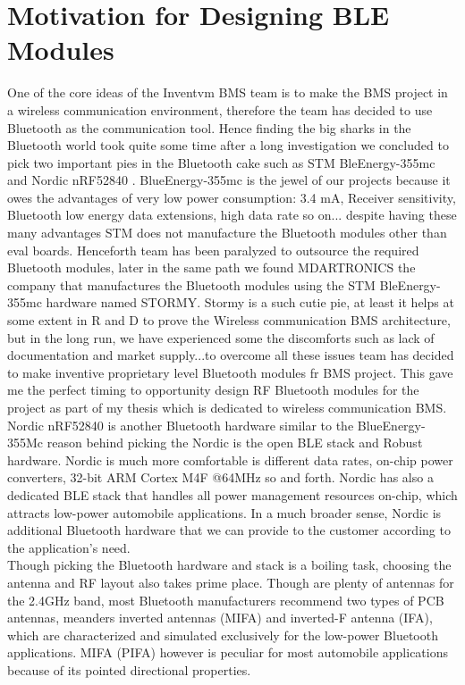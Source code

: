 \section{Motivation for Designing BLE Modules }
One of the core ideas of the Inventvm BMS team is to make the BMS project in a wireless communication environment, therefore the team has decided to use Bluetooth as the communication tool. Hence finding the big sharks in the Bluetooth world took quite some time after a long investigation we concluded to pick two important pies in the Bluetooth cake such as STM BleEnergy-355mc \cite{BLNRG355_STEVAL_GUIDE} and Nordic nRF52840 \cite{NORDIC_nrf52840_USERGUIDE}. BlueEnergy-355mc is the jewel of our projects because it owes the advantages of very low power consumption: 3.4 mA, Receiver sensitivity, Bluetooth low energy data extensions, high data rate so on... despite having these many advantages STM does not manufacture the Bluetooth modules other than eval boards. Henceforth team has been paralyzed to outsource the required Bluetooth modules, later in the same path we found MDARTRONICS the company that manufactures the Bluetooth modules using the STM BleEnergy-355mc hardware named STORMY. Stormy is a such cutie pie, at least it helps at some extent in R and D to prove the Wireless communication BMS architecture, but in the long run, we have experienced some the discomforts such as lack of documentation and market supply...to overcome all these issues team has decided to make inventive proprietary level Bluetooth modules fr BMS project. This gave me the perfect timing to opportunity design RF Bluetooth modules for the project as part of my thesis which is dedicated to wireless communication BMS.\\
\indent Nordic nRF52840\cite{NORDIC_nrf52840_USERGUIDE} is another Bluetooth hardware similar to the BlueEnergy-355Mc reason behind picking the Nordic is the open BLE stack and Robust hardware. Nordic is much more comfortable is different data rates, on-chip power converters, 32-bit ARM Cortex M4F @64MHz so and forth. Nordic has also a dedicated BLE stack \cite{NORDIC_nrf52840_SOFTWARESTACK_GUIDE} that handles all power management resources on-chip, which attracts low-power automobile applications. In a much broader sense, Nordic is additional Bluetooth hardware that we can provide to the customer according to the application's need.\\
\indent Though picking the Bluetooth hardware and stack is a boiling task, choosing the antenna and RF layout also takes prime place. Though are plenty of antennas for the 2.4GHz band, most Bluetooth manufacturers recommend two types of PCB antennas, meanders inverted antennas (MIFA) and inverted-F antenna (IFA), which are characterized and simulated exclusively for the low-power Bluetooth applications. MIFA (PIFA) however is peculiar for most automobile applications because of its pointed directional properties.\\

